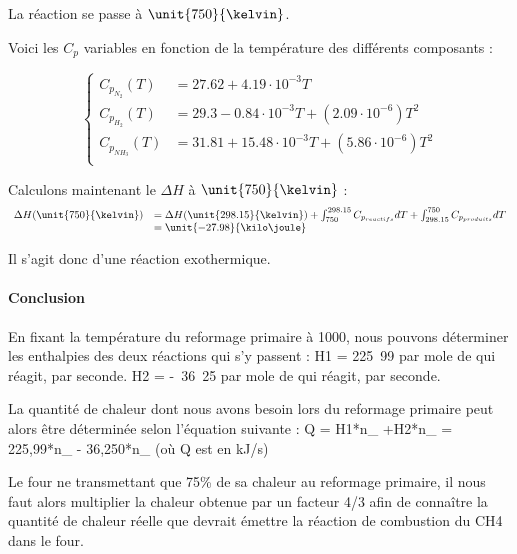 La réaction se passe à $\unit{750}{\kelvin}$.
						
Voici les $C_p$ variables en fonction de la température des différents composants\cite{hc-table} :

$$
	\left\{
		\begin{array}{rl}
			C_{p_{N_2}}(T) 	&= 27.62 + 4.19\cdot10^{-3}T \\
			C_{p_{H_2}}(T)	&= 29.3 - 0.84\cdot10^{-3}T + (2.09\cdot10^{-6})T^2\\
			C_{p_{NH_3}}(T) 	&= 31.81 + 15.48\cdot10^{-3}T + (5.86\cdot10^{-6})T^2 \\
		\end{array}
	\right.
$$
					
Calculons maintenant le $\Delta H$ à $\unit{750}{\kelvin}$ :			
$$
	\begin{array}{rl}
		 	 \Delta H(\unit{750}{\kelvin})	&=  \Delta H(\unit{298.15}{\kelvin}) 
																							+ \int_{750}^{298.15} C_{p_{reactifs}} dT + \int_{298.15}^{750} C_{p_{produits}} dT \\
																				&=  \unit{-27.98}{\kilo\joule}
	\end{array}
$$	
	
Il s'agit donc d'une réaction exothermique.

\paragraph{Conclusion}
En fixant la température du reformage primaire à \unit{1000}{\kelvin}, nous pouvons déterminer les enthalpies des deux 
réactions qui s’y passent :
\Delta H1 = \unit{225.99}{\kilo\joule} par mole de  qui réagit, par seconde.
\Delta H2 = \unit{-36.25}{\kilo\joule} par mole de  qui réagit, par seconde.

La quantité de chaleur dont nous avons besoin lors du reformage primaire peut alors être déterminée selon l’équation suivante : 
Q = \Delta H1*n_{} +\Delta H2*n_{} = 225,99*n_{} - 36,250*n_{}
(où Q est en kJ/s)

Le four ne transmettant que 75\% de sa chaleur au reformage primaire, il nous faut alors multiplier la chaleur 
obtenue par un facteur 4/3 afin de connaître la quantité de chaleur réelle que devrait émettre la réaction de combustion 
du CH4 dans le four.


